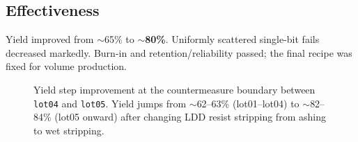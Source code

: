 \subsection{Effectiveness}
Yield improved from $\sim$65\% to \textbf{$\sim$80\%}. Uniformly scattered single-bit fails decreased markedly. Burn-in and retention/reliability passed; the final recipe was fixed for volume production.

\begin{figure}[t]
\centering
{}\yieldtbl
{}
\caption{Yield step improvement at the countermeasure boundary
between \texttt{lot04} and \texttt{lot05}. Yield jumps from $\sim$62--63\% 
(lot01--lot04) to $\sim$82--84\% (lot05 onward) after changing 
LDD resist stripping from ashing to wet stripping.}
\label{fig:yield}
\end{figure}
